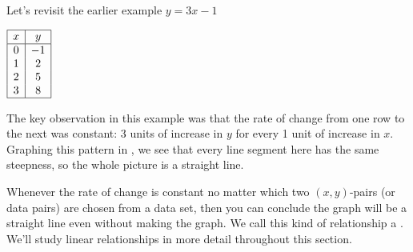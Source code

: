 \documentclass[nooutcomes]{ximera}
\begin{document}
Let's revisit the earlier example $y=3x-1$

\begin{center}
$
\begin{array}{|c|c|}
\hline
x&y\\
\hline
0&-1\\
1&2\\
2&5\\
3&8 \\
\hline 
\end{array}
$
\end{center}


The key observation in this example was that the rate of change from one row to the next was constant: 3 units of increase in $y$ for every 1  unit of increase in $x$. Graphing this pattern in , we see that every line segment here has the same steepness, so the whole picture is a straight line.

\begin{image}
\end{image}

Whenever the rate of change is constant no matter which two $(x,y)$-pairs (or data pairs) are chosen from a data set, then you can conclude the graph will be a straight line even without making the graph. We call this kind of relationship a . We'll study linear relationships in more detail throughout this section.
\end{document}
